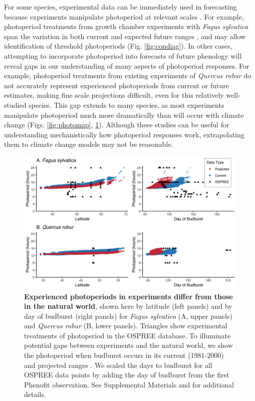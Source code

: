 \documentclass{article}
\begin{document}
\par For some species, experimental data can be immediately used in forecasting because experiments manipulate photoperiod at relevant scales \citep[e.g., ][Figs. \ref{fig:photomap}, \ref{fig:fagus} A, Table S1]{Basler:2014aa,Heide:2015aa}. For example, photoperiod treatments from growth chamber experiments with \emph{Fagus sylvatica} span the variation in both current and expected future ranges \citep[Fig. \ref{fig:fagus}, ][]{duputie2015}, and may allow identification of threshold photoperiods (Fig. \ref{fig:condiag}). In other cases, attempting to incorporate photoperiod into forecasts of future phenology will reveal gaps in our understanding of many aspects of photoperiod responses. For example, photoperiod treatments from existing experiments of \emph{Quercus robur} do not accurately represent experienced photoperiods from current or future estimates, making fine scale projections difficult, even for this relatively well-studied species. This gap extends to many species, as most experiments manipulate photoperiod much more dramatically than will occur with climate change (Figs. \ref{fig:photomap}, \ref{fig:fagus}). Although these studies can be useful for understanding mechanistically how photoperiod responses work, extrapolating them to climate change models may not be reasonable.
 

\begin{figure}[p]
\includegraphics{..//..//analyses/photoperiod/figures/2D_actual_combined.png} 
\caption{\textbf{Experienced photoperiods in experiments differ from those in the natural world}, shown here by latitude (left panels) and by day of budburst (right panels) for \emph{Fagus sylvatica} (A, upper panels) and \emph{Quercus robur} (B, lower panels). Triangles show experimental treatments of photoperiod in the OSPREE database. To illuminate potential gaps between experiments and the natural world, we show the photoperiod when budburst occurs in its current (1981-2000) and projected ranges \citep[2081-2100, using the A1Fi Phenofit scenario, see][]{duputie2015}. We scaled the days to budburst for all OSPREE data points by adding the day of budburst from the first Phenofit observation. See Supplemental Materials and \citet{duputie2015} for additional details.} 
 \label{fig:fagus}
 \end{figure}
 
\end{document}
